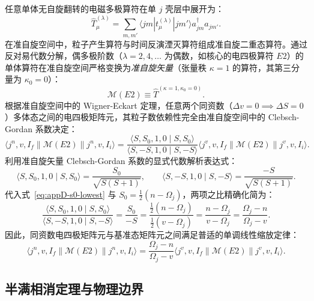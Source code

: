 任意单体无自旋翻转的电磁多极算符在单 $j$ 壳层中展开为：
\begin{equation}\label{eq:appD-one-body-em-op}
\hat{T}^{(\lambda)}_\mu = \sum_{m, m'} \langle j m | t^{(\lambda)}_\mu | j m' \rangle a_{jm}^\dagger a_{jm'}.
\end{equation}
在准自旋空间中，粒子产生算符与时间反演湮灭算符组成准自旋二重态算符。通过反对易代数分解，偶多极阶数（$\lambda = 2, 4, \dots$ 为偶数，如核心的电四极算符 $E2$）的单体算符在准自旋空间严格变换为\emph{准自旋矢量}（张量秩 $\kappa = 1$ 的算符，其第三分量为 $\kappa_0 = 0$）：
\begin{equation}\label{eq:appD-e2-quasispin-vector}
\mathcal{M}(E2) \equiv \hat{T}^{(\kappa=1, \kappa_0=0)}.
\end{equation}
根据准自旋空间中的 Wigner-Eckart 定理，任意两个同资数（$\Delta v = 0 \implies \Delta S = 0$）多体态之间的电四极矩阵元，其粒子数依赖性完全由准自旋空间中的 Clebsch-Gordan 系数决定：
\begin{equation}\label{eq:appD-wigner-eckart-quasispin}
\langle j^n, v, I_f \| \mathcal{M}(E2) \| j^n, v, I_i \rangle = \frac{\langle S, S_0, 1, 0 \mid S, S_0 \rangle}{\langle S, -S, 1, 0 \mid S, -S \rangle} \langle j^v, v, I_f \| \mathcal{M}(E2) \| j^v, v, I_i \rangle.
\end{equation}
利用准自旋矢量 Clebsch-Gordan 系数的显式代数解析表达式：
\begin{equation}\label{eq:appD-cg-analytical}
\langle S, S_0, 1, 0 \mid S, S_0 \rangle = \frac{S_0}{\sqrt{S(S+1)}}, \qquad \langle S, -S, 1, 0 \mid S, -S \rangle = \frac{-S}{\sqrt{S(S+1)}}.
\end{equation}
代入式~\eqref{eq:appD-s0-lowest} 与 $S_0 = \frac{1}{2}(n - \Omega_j)$，两项之比精确化简为：
\begin{equation}\label{eq:appD-cg-ratio}
\frac{\langle S, S_0, 1, 0 \mid S, S_0 \rangle}{\langle S, -S, 1, 0 \mid S, -S \rangle} = \frac{S_0}{-S} = \frac{\frac{1}{2}(n - \Omega_j)}{\frac{1}{2}(v - \Omega_j)} = \frac{n - \Omega_j}{v - \Omega_j} = \frac{\Omega_j - n}{\Omega_j - v}.
\end{equation}
因此，同资数电四极矩阵元与基准态矩阵元之间满足普适的单调线性缩放定律：
\begin{equation}\label{eq:appD-seniority-e2-scaling}
\langle j^n, v, I_f \| \mathcal{M}(E2) \| j^n, v, I_i \rangle = \frac{\Omega_j - n}{\Omega_j - v} \langle j^v, v, I_f \| \mathcal{M}(E2) \| j^v, v, I_i \rangle.
\end{equation}

\subsection{半满相消定理与物理边界}

